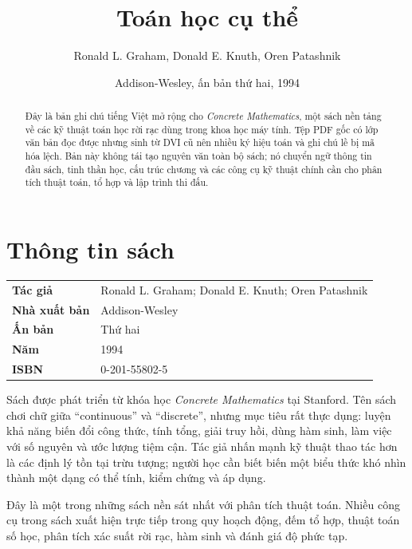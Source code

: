 \documentclass[11pt]{article}
\title{Toán học cụ thể}
\author{Ronald L. Graham, Donald E. Knuth, Oren Patashnik}
\date{Addison-Wesley, ấn bản thứ hai, 1994}
\begin{document}
\maketitle


\renewcommand{\abstractname}{Tóm tắt}
\begin{abstract}
Đây là bản ghi chú tiếng Việt mở rộng cho \emph{Concrete Mathematics}, một
sách nền tảng về các kỹ thuật toán học rời rạc dùng trong khoa học máy tính.
Tệp PDF gốc có lớp văn bản đọc được nhưng sinh từ DVI cũ nên nhiều ký hiệu
toán và ghi chú lề bị mã hóa lệch. Bản này không tái tạo nguyên văn toàn bộ
sách; nó chuyển ngữ thông tin đầu sách, tinh thần học, cấu trúc chương và các
công cụ kỹ thuật chính cần cho phân tích thuật toán, tổ hợp và lập trình thi
đấu.
\end{abstract}

\section{Thông tin sách}

\begin{center}
\begin{tabular}{ll}
\textbf{Tác giả} & Ronald L. Graham; Donald E. Knuth; Oren Patashnik \\
\textbf{Nhà xuất bản} & Addison-Wesley \\
\textbf{Ấn bản} & Thứ hai \\
\textbf{Năm} & 1994 \\
\textbf{ISBN} & 0-201-55802-5
\end{tabular}
\end{center}

Sách được phát triển từ khóa học \emph{Concrete Mathematics} tại Stanford.
Tên sách chơi chữ giữa ``continuous'' và ``discrete'', nhưng mục tiêu rất thực
dụng: luyện khả năng biến đổi công thức, tính tổng, giải truy hồi, dùng hàm
sinh, làm việc với số nguyên và ước lượng tiệm cận. Tác giả nhấn mạnh kỹ thuật
thao tác hơn là các định lý tồn tại trừu tượng; người học cần biết biến một
biểu thức khó nhìn thành một dạng có thể tính, kiểm chứng và áp dụng.

Đây là một trong những sách nền sát nhất với phân tích thuật toán. Nhiều công
cụ trong sách xuất hiện trực tiếp trong quy hoạch động, đếm tổ hợp, thuật toán
số học, phân tích xác suất rời rạc, hàm sinh và đánh giá độ phức tạp.
\end{document}
